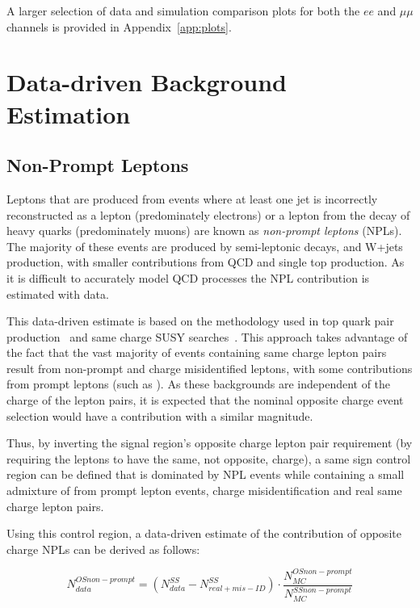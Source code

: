 A larger selection of data and simulation comparison plots for both the $ee$ and $\mu\mu$ channels is provided in Appendix~\ref{app:plots}.

\section{Data-driven Background Estimation}\label{sec:dataDrivenBackground}

\subsection{Non-Prompt Leptons}\label{sec:NPLs}
Leptons that are produced from events where at least one jet is incorrectly reconstructed as a lepton (predominately electrons) or a lepton from the decay of heavy quarks (predominately muons) are known as \emph{non-prompt leptons} (NPLs).
The majority of these events are produced by semi-leptonic \ttbar decays, and W+jets production, with smaller contributions from QCD and single top production.
As it is difficult to accurately model QCD processes the NPL contribution is estimated with data.

This data-driven estimate is based on the methodology used in top quark pair production~\cite{CMS:2016syx} and same charge SUSY searches~\cite{CMS:2015vqc}.
This approach takes advantage of the fact that the vast majority of events containing same charge lepton pairs result from non-prompt and charge misidentified leptons, with some contributions from prompt leptons (such as \ttV).
As these backgrounds are independent of the charge of the lepton pairs, it is expected that the nominal opposite charge event selection would have a contribution with a similar magnitude.

Thus, by inverting the signal region's opposite charge lepton pair requirement (\ie by requiring the leptons to have the same, not opposite, charge), a same sign control region can be defined that is dominated by NPL events while containing a small admixture of from prompt lepton events, charge misidentification and real same charge lepton pairs.

Using this control region, a data-driven estimate of the contribution of opposite charge NPLs can be derived as follows:

\begin{equation}\label{eq:NPL}
N_{data}^{OS non-prompt} = (N_{data}^{SS} - N^{SS}_{real + mis-ID}) \cdot \frac{N_{MC}^{OS non-prompt}}{N_{MC}^{SS non-prompt}}
\end{equation}

